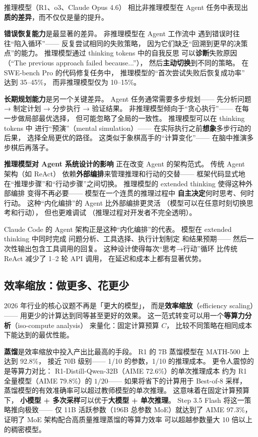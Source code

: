 推理模型（R1、o3、Claude Opus 4.6）
相比非推理模型在 Agent 任务中表现出
\textbf{质的差异}，而不仅仅是量的提升。

\textbf{错误恢复能力}是最显著的差异。
非推理模型在 Agent 工作流中
遇到错误时往往“陷入循环”——
反复尝试相同的失败策略，
因为它们缺乏“回溯到更早的决策点”的能力。
推理模型通过 thinking tokens 中的自我反思
可以\textbf{诊断}失败原因（“The previous approach failed because...”），
然后\textbf{主动切换}到不同的策略。
在 SWE-bench Pro 的代码修复任务中，
推理模型的“首次尝试失败后恢复成功率”
达到 35--45\%，
而非推理模型仅为 10--15\%。

\textbf{长期规划能力}是另一个关键差异。
Agent 任务通常需要多步规划——
先分析问题 → 制定计划 → 分步执行 → 验证结果。
非推理模型倾向于“贪心执行”——
在每一步做局部最优选择，
但可能忽略了全局的一致性。
推理模型可以在 thinking tokens 中
进行“预演”（mental simulation）——
在实际执行之前\textbf{想象}多步行动的后果，
选择全局更优的路径。
这类似于象棋高手的“计算变化”——
在脑中推演多步棋后再落子。

\textbf{推理模型对 Agent 系统设计的影响}
正在改变 Agent 的架构范式。
传统 Agent 架构（如 ReAct）
依赖\textbf{外部编排}来管理推理和行动的交替——
框架代码显式地在“推理步骤”和“行动步骤”之间切换。
推理模型的 extended thinking 使得这种外部编排
变得不再必要——
模型在一个连贯的推理过程中
\textbf{自主决定}何时思考、何时行动。
这种“内化编排”的 Agent
比外部编排更灵活
（模型可以在任意时刻切换思考和行动），
但也更难调试
（推理过程对开发者不完全透明）。

Claude Code 的 Agent 架构正是这种“内化编排”的代表。
模型在 extended thinking 中同时完成
问题分析、工具选择、执行计划制定
和结果预期——
然后一次性输出包含工具调用的回复。
这种设计使得每次“思考→行动”循环
比传统 ReAct 减少了 1--2 轮 API 调用，
在延迟和成本上都有显著优势。

\subsection{效率缩放：做更多、花更少}

2026 年行业的核心议题不再是「更大的模型」，
而是\textbf{效率缩放}（efficiency scaling）——
用更少的计算达到同等甚至更好的效果。
这一范式转变可以用一个\textbf{等算力分析}（iso-compute analysis）
来量化：固定计算预算 $C$，
比较不同策略在相同成本下能达到的最优性能。

\textbf{蒸馏}是效率缩放中投入产出比最高的手段。
R1 的 7B 蒸馏模型在 MATH-500 上达到 92.8\%，
接近 70B 级别——
1/10 的参数，1/10 的推理成本。
更令人震惊的是等算力对比：
R1-Distill-Qwen-32B（AIME 72.6\%）的单次推理成本
约为 R1 全量模型（AIME 79.8\%）的 $1/20$——
如果将省下的计算用于 Best-of-8 采样，
蒸馏模型的有效准确率可以超过教师模型的单次推理。
这意味着在固定计算预算下，
\textbf{小模型 + 多次采样}可以优于\textbf{大模型 + 单次推理}。
Step 3.5 Flash 将这一策略推向极致——
仅 11B 活跃参数（196B 总参数 MoE）就达到了 AIME 97.3\%，
证明了 MoE 架构配合高质量推理蒸馏的等算力效率
可以超越参数量大 10 倍以上的稠密模型。

